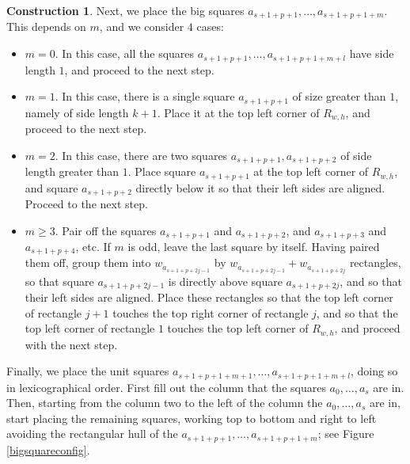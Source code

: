\documentclass[pagebackref,colorlinks,citecolor=blue,linkcolor=blue,urlcolor=blue,filecolor=blue]{article}
\theoremstyle{definition}\newtheorem{definition}[thm]{Definition}
\theoremstyle{definition}
\newtheorem{const}[thm]{Construction}
\begin{document}
\begin{const}
Next, we place the big squares $a_{s+1+p+1},\dots, a_{s+1+p+1+m}$.
This depends on $m$, and we consider $4$ cases:
\begin{itemize}
\item $m=0$. In this case, all the squares $a_{s+1+p+1},\dots,a_{s+1+p+1+m+l}$ have side length $1$, and proceed to the next step.
\item $m=1$. In this case, there is a single square $a_{s+1+p+1}$ of size greater than $1$, namely of side length $k+1$. 
Place it at the top left corner of $R_{w,h}$, and proceed to the next step. 
\item $m=2$. In this case, there are two squares $a_{s+1+p+1}, a_{s+1+p+2}$ of side length greater than $1$.
Place square $a_{s+1+p+1}$ at the top left corner of $R_{w,h}$, and square $a_{s+1+p+2}$ directly below it so that their left sides are aligned. 
Proceed to the next step.
\item $m\ge 3$. Pair off the squares $a_{s+1+p+1}$ and $a_{s+1+p+2}$, and $a_{s+1+p+3}$ and $a_{s+1+p+4}$, etc. If $m$ is odd, leave the last square by itself.
Having paired them off, group them into $w_{a_{s+1+p+2j-1}}$ by $w_{a_{s+1+p+2j-1}}+w_{a_{s+1+p+2j}}$ rectangles, so that square $a_{s+1+p+2j-1}$ is directly above square $a_{s+1+p+2j}$, and so that their left sides are aligned.
Place these rectangles so that the top left corner of rectangle $j+1$ touches the top right corner of rectangle $j$, and so that the top left corner of rectangle $1$ touches the top left corner of $R_{w,h}$, and proceed with the next step. 
\end{itemize}

Finally, we place the unit squares $a_{s+1+p+1+m+1},\dots, a_{s+1+p+1+m+l}$, doing so in lexicographical order.
First fill out the column that the squares $a_{0}, \dots, a_{s}$ are in.
Then, starting from the column two to the left of the column the $a_{0}, \dots, a_{s}$ are in, start placing the remaining squares, working top to bottom and right to left avoiding the rectangular hull of the $a_{s+1+p+1},\dots, a_{s+1+p+1+m}$; see Figure \ref{bigsquareconfig}.
\end{const}
\end{document}
